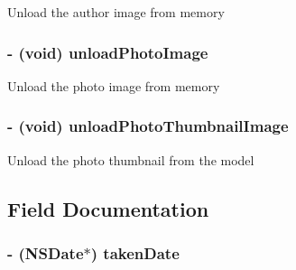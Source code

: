 \label{interface_p_b_image_a309bbbd97bdb73cd5ce68b85dd10d2ef}
Unload the author image from memory \hypertarget{interface_p_b_image_a59d1856264f9708693f57071a56a03f5}{
\subsubsection[{unloadPhotoImage}]{\setlength{\rightskip}{0pt plus 5cm}-\/ (void) unloadPhotoImage }}
\label{interface_p_b_image_a59d1856264f9708693f57071a56a03f5}
Unload the photo image from memory \hypertarget{interface_p_b_image_a4b836242ce7c4ce1cd008a487481d6bf}{
\subsubsection[{unloadPhotoThumbnailImage}]{\setlength{\rightskip}{0pt plus 5cm}-\/ (void) unloadPhotoThumbnailImage }}
\label{interface_p_b_image_a4b836242ce7c4ce1cd008a487481d6bf}
Unload the photo thumbnail from the model 

\subsection{Field Documentation}
\hypertarget{interface_p_b_image_a9870fa11fd951bc55b7a115c227f0f97}{
\subsubsection[{takenDate}]{\setlength{\rightskip}{0pt plus 5cm}-\/ (NSDate$\ast$) {\bf takenDate}}}
\label{interface_p_b_image_a9870fa11fd951bc55b7a115c227f0f97}


